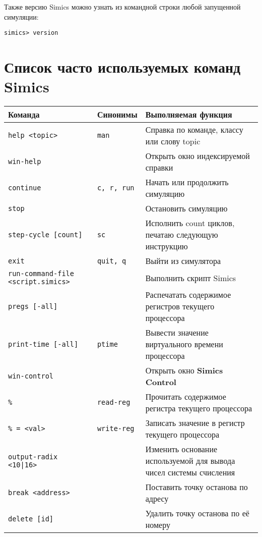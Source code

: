Также версию Simics можно узнать из командной строки любой запущенной симуляции:

\begin{lstlisting}
simics> version
\end{lstlisting}

\section{Список часто используемых команд Simics}

\begin{center}
\small
\begin{tabularx}{\textwidth}{Xlp{}}
\textbf{Команда}                          & \textbf{Синонимы}  & \textbf{Выполняемая функция}\\\hline
\texttt{help <topic>}                     & \texttt{man}       & Справка по команде, классу или слову topic\\
\texttt{win-help}                         &                    & Открыть окно индексируемой справки \\
\texttt{continue}                         & \texttt{c, r, run} & Начать или продолжить симуляцию\\
\texttt{stop}                             &                    & Остановить симуляцию\\
\texttt{step-cycle [count]}               & \texttt{sc}        & Исполнить count циклов, печатаю следующую инструкцию\\
\texttt{exit}                             & \texttt{quit, q}   & Выйти из симулятора\\
\texttt{run-command-file <script.simics>} &                    & Выполнить скрипт Simics\\
\texttt{pregs [-all]}                     &                    & Распечатать содержимое регистров текущего процессора\\
\texttt{print-time [-all]}                & \texttt{ptime}     & Вывести значение виртуального времени процессора\\
\texttt{win-control}                      &                    & Открыть окно \textbf{Simics Control}\\
\texttt{\%<register name>}                & \texttt{read-reg}  & Прочитать содержимое регистра текущего процессора \\
\texttt{\%<register name> = <val>}        & \texttt{write-reg} & Записать значение в регистр текущего процессора \\
\texttt{output-radix <10|16>}             &                    & Изменить основание используемой для вывода чисел системы счисления\\
\texttt{break <address>}                  &                    & Поставить точку останова по адресу \\
\texttt{delete [id]}                      &                    & Удалить точку останова по её номеру \\
\end{tabularx}

\end{center}




